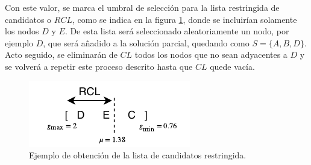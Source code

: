 Con este valor, se marca el umbral de selección para la lista restringida de candidatos o $RCL$, como se indica en la figura \ref{fig:const:rlc}, donde se incluirían solamente los nodos $D$ y $E$. De esta lista será seleccionado aleatoriamente un nodo, por ejemplo $D$, que será añadido a la solución parcial, quedando como $S = \{A, B, D\}$. Acto seguido, se eliminarán de $CL$ todos los nodos que no sean adyacentes a $D$ y se volverá a repetir este proceso descrito hasta que $CL$ quede vacía.

\begin{figure}[H]
	\centering
	\includegraphics[scale=2]{Figures/proc-const/rcl.pdf}
	\caption{\footnotesize Ejemplo de obtención de la lista de candidatos restringida.}
	\label{fig:const:rlc}
\end{figure}

%
%

